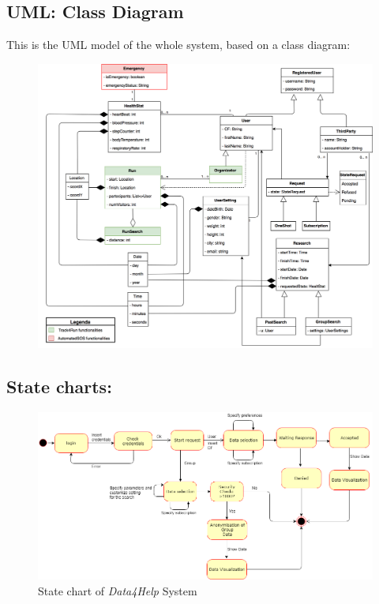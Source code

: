 \subsection{UML: Class Diagram}
This is the UML model of  the whole system, based on a class diagram:
\begin{figure}[H]
    \centering
    \includegraphics[scale=0.2]{Pictures/UML.png}

\end{figure}

\newpage
\subsection{State charts:}

\begin{figure}[H]
    \centering
    \includegraphics[scale=0.4]{Pictures/stateChart1.png}
    \caption{State chart of \emph{Data4Help} System}
\end{figure}

